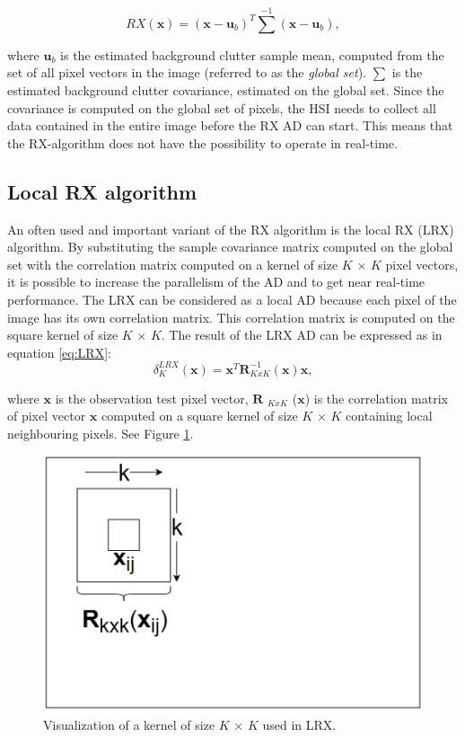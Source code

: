 \begin{equation}
    RX(\textbf{x}) = (\textbf{x} - \textbf{u}_b)^T \sum^{-1} (\textbf{x} - \textbf{u}_b),	
\label{eq:RX_algorithm}
\end{equation}

where $\textbf{u}_b$ is the estimated background clutter sample mean, computed from the set of all pixel vectors in the image (referred to as the \textit{global set}). $\sum$ is the estimated background clutter covariance, estimated on the global set. Since the covariance is computed on the global set of pixels, the HSI needs to collect all data contained in the entire image before the RX AD can start. This means that the RX-algorithm does not have the possibility to operate in real-time. 

\subsection{Local RX algorithm}
\label{sec:LRX_theory}
An often used and important variant of the RX algorithm is the local RX (LRX) algorithm. By substituting the sample covariance matrix computed on the global set with the correlation matrix computed on a kernel of size $K$ $\times$ $K$ pixel vectors, it is possible to increase the parallelism of the AD and to get near real-time performance. The LRX can be considered as a local AD because each pixel of the image has its own correlation matrix. This correlation matrix is computed on the square kernel of size $K$ $\times$ $K$. The 
result of the LRX AD can be expressed as in equation \ref{eq:LRX}: 
\begin{equation}
    \delta_K^{LRX}(\textbf{x}) = \textbf{x}^T\textbf{R}^{-1}_{K x K}(\textbf{x})\textbf{x},
    \label{eq:LRX}
\end{equation}

 where $\textbf{x}$ is the observation test pixel vector, $\textbf{R}$ $_{K x K}$ ($\textbf{x}$) is the correlation matrix of pixel vector $\textbf{x}$ computed on a square kernel of size $K$ $\times$ $K$ containing local neighbouring pixels. See Figure \ref{fig:LRX}. 




\begin{figure}[H]
\centering
   \includegraphics[scale=0.45]{images/LRX.PNG}
  \caption{ Visualization of a kernel of size $K$ $\times$ $K$ used in LRX. } 
  \label{fig:LRX}
\end{figure}



